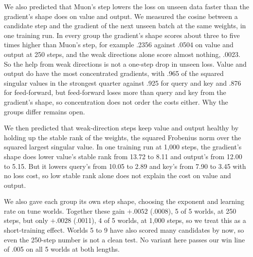 \documentclass[11pt]{article}
\begin{document}
We also predicted that Muon's step lowers the loss on unseen data faster than the gradient's shape does on value and output. We measured the cosine between a candidate step and the gradient of the next unseen batch at the same weights, in one training run. In every group the gradient's shape scores about three to five times higher than Muon's step, for example .2356 against .0504 on value and output at 250 steps, and the weak directions alone score almost nothing, .0023. So the help from weak directions is not a one-step drop in unseen loss. Value and output do have the most concentrated gradients, with .965 of the squared singular values in the strongest quarter against .925 for query and key and .876 for feed-forward, but feed-forward loses more than query and key from the gradient's shape, so concentration does not order the costs either. Why the groups differ remains open.

We then predicted that weak-direction steps keep value and output healthy by holding up the stable rank of the weights, the squared Frobenius norm over the squared largest singular value. In one training run at 1,000 steps, the gradient's shape does lower value's stable rank from 13.72 to 8.11 and output's from 12.00 to 5.15. But it lowers query's from 10.05 to 2.89 and key's from 7.90 to 3.45 with no loss cost, so low stable rank alone does not explain the cost on value and output.

We also gave each group its own step shape, choosing the exponent and learning rate on tune worlds. Together these gain $+.0052$ (.0008), 5 of 5 worlds, at 250 steps, but only $+.0028$ (.0011), 4 of 5 worlds, at 1,000 steps, so we treat this as a short-training effect. Worlds 5 to 9 have also scored many candidates by now, so even the 250-step number is not a clean test. No variant here passes our win line of .005 on all 5 worlds at both lengths.
\end{document}
